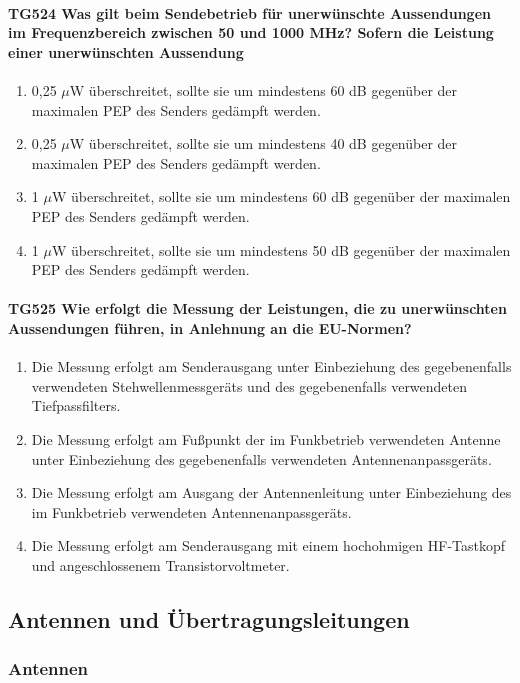 \documentclass[8pt]{article}
\begin{document}
\paragraph*{TG524 Was gilt beim Sendebetrieb für unerwünschte Aussendungen im Frequenzbereich zwischen 50 und 1000 MHz? Sofern die Leistung einer unerwünschten Aussendung}
\begin{enumerate}[nolistsep,label=\Alph*]
\item 0,25 $\mu$W überschreitet, sollte sie um mindestens 60 dB gegenüber der maximalen PEP des Senders gedämpft werden.
\item 0,25 $\mu$W überschreitet, sollte sie um mindestens 40 dB gegenüber der maximalen PEP des Senders gedämpft werden.
\item 1 $\mu$W überschreitet, sollte sie um mindestens 60 dB gegenüber der maximalen PEP des Senders gedämpft werden.
\item 1 $\mu$W überschreitet, sollte sie um mindestens 50 dB gegenüber der maximalen PEP des Senders gedämpft werden.
\end{enumerate}

\paragraph*{TG525 Wie erfolgt die Messung der Leistungen, die zu unerwünschten Aussendungen führen, in Anlehnung an die EU-Normen?}
\begin{enumerate}[nolistsep,label=\Alph*]
\item Die Messung erfolgt am Senderausgang unter Einbeziehung des gegebenenfalls verwendeten Stehwellenmessgeräts und des gegebenenfalls verwendeten Tiefpassfilters.
\item Die Messung erfolgt am Fußpunkt der im Funkbetrieb verwendeten Antenne unter Einbeziehung des gegebenenfalls verwendeten Antennenanpassgeräts. 
\item Die Messung erfolgt am Ausgang der Antennenleitung unter Einbeziehung des im Funkbetrieb verwendeten Antennenanpassgeräts.
\item Die Messung erfolgt am Senderausgang mit einem hochohmigen HF-Tastkopf und angeschlossenem Transistorvoltmeter.
\end{enumerate}

\pagebreak
\subsection{Antennen und Übertragungsleitungen}
\subsubsection{Antennen}
\end{document}
